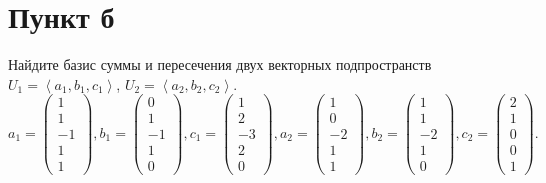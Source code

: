 \documentclass[12pt]{article}
\begin{document}
    \section*{Пункт б}
    Найдите базис суммы и пересечения двух векторных подпространств $U_1 = \left < a_1, b_1, c_1 \right >$, $U_2 = \left < a_2, b_2, c_2 \right >$.
    \[
        a_1 =
        \begin{pmatrix}
            1 \\ 1 \\ -1 \\ 1 \\ 1
        \end{pmatrix},
        b_1 =
        \begin{pmatrix}
            0 \\ 1 \\ -1 \\ 1 \\ 0
        \end{pmatrix},
        c_1 =
        \begin{pmatrix}
            1 \\ 2 \\ -3 \\ 2 \\ 0
        \end{pmatrix},
        a_2 =
        \begin{pmatrix}
            1 \\ 0 \\ -2 \\ 1 \\ 1
        \end{pmatrix},
        b_2 =
        \begin{pmatrix}
            1 \\ 1 \\ -2 \\ 1 \\ 0
        \end{pmatrix},
        c_2 =
        \begin{pmatrix}
            2 \\ 1 \\ 0 \\ 0 \\ 1
        \end{pmatrix}.
    \]
\end{document}
